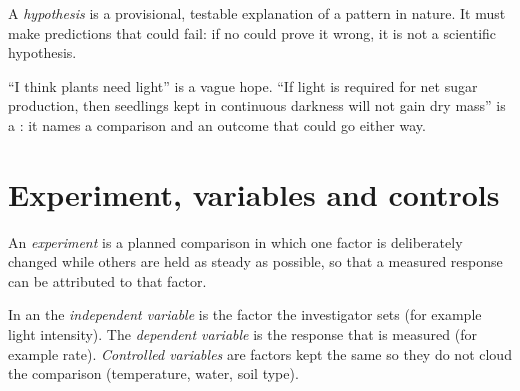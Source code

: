 \begin{definition}[Hypothesis]\label{def:g10:scientific-biology:hypothesis}
A \emph{hypothesis} is a provisional, testable
explanation of a pattern in nature. It must make predictions that
could fail: if no  could prove it wrong, it is not a
scientific hypothesis.
\end{definition}

\begin{remark}\label{rem:g10:scientific-biology:guess}
``I think plants need light'' is a vague hope. ``If light is required
for net sugar production, then seedlings kept in continuous darkness
will not gain dry mass'' is a : it names a comparison and
an outcome that could go either way.
\end{remark}

\section{Experiment, variables and controls}

\begin{definition}[Experiment]\label{def:g10:scientific-biology:experiment}
An \emph{experiment} is a planned comparison in which
one factor is deliberately changed while others are held as steady as
possible, so that a measured response can be attributed to that factor.
\end{definition}

\begin{definition}[Variables]\label{def:g10:scientific-biology:variables}
In an  the \emph{independent variable}
is the factor the investigator sets (for example light intensity). The
\emph{dependent variable} is the response that
is measured (for example  rate). \emph{Controlled
variables} are factors kept the same so they
do not cloud the comparison (temperature, water, soil type).
\end{definition}

